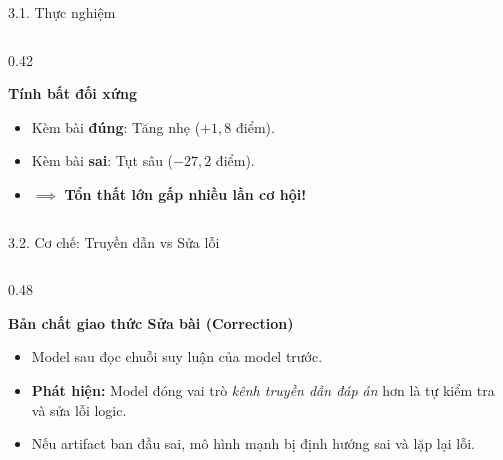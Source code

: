 \documentclass[aspectratio=169,10pt]{beamer}
\begin{document}
\begin{frame}{3.1. Thực nghiệm}
\begin{columns}[c]
\begin{column}{0.42\textwidth}
      \begin{block}{\textbf{Tính bất đối xứng}}
        \begin{itemize}\small
          \item Kèm bài \textbf{đúng}: Tăng nhẹ ($+1{,}8$ điểm).
          \item Kèm bài \textbf{sai}: Tụt sâu ($-27{,}2$ điểm).
          \item $\implies$ \textbf{Tổn thất lớn gấp nhiều lần cơ hội!}
        \end{itemize}
      \end{block}
    \end{column}
  \end{columns}
\end{frame}

\begin{frame}{3.2. Cơ chế: Truyền dẫn vs Sửa lỗi}
  \begin{columns}[t]
    \begin{column}{0.48\textwidth}
      \begin{block}{\textbf{Bản chất giao thức Sửa bài (Correction)}}
        \begin{itemize}\small
          \item Model sau đọc chuỗi suy luận của model trước.
          \item \textbf{Phát hiện:} Model đóng vai trò \emph{kênh truyền dẫn đáp án} hơn là tự kiểm tra và sửa lỗi logic.
          \item Nếu artifact ban đầu sai, mô hình mạnh bị định hướng sai và lặp lại lỗi.
        \end{itemize}
      \end{block}
    \end{column}
    

\end{columns}
\end{frame}
\end{document}
